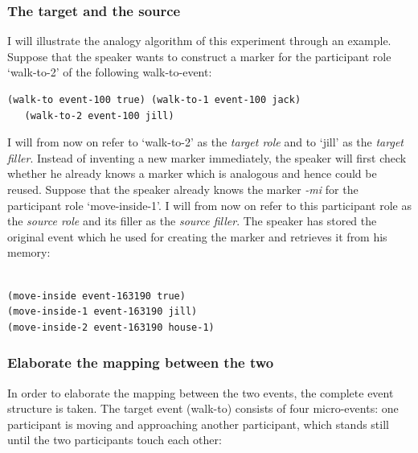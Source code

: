\subsubsection{The target and the source}
 I will illustrate the analogy algorithm of this experiment through an example. Suppose that the speaker wants to construct a marker for the participant role `walk-to-2' of the following walk-to-event:

\ea
\begin{lstlisting}
(walk-to event-100 true) (walk-to-1 event-100 jack)
   (walk-to-2 event-100 jill)
\end{lstlisting}
\z

I will from now on refer to `walk-to-2' as the {\em target role} and to `jill' as the {\em target filler}. Instead of inventing a new marker immediately, the speaker will first check whether he already knows a marker which is analogous and hence could be reused. Suppose that the speaker already knows the marker {\em -mi} for the participant role `move-inside-1'. I will from now on refer to this participant role as the {\em source role} and its filler as the {\em source filler}. The speaker has stored the original event which he used for creating the marker and retrieves it from his memory:

\ea
\begin{lstlisting}
 
(move-inside event-163190 true) 
(move-inside-1 event-163190 jill)
(move-inside-2 event-163190 house-1)
\end{lstlisting}
\z

\subsubsection{Elaborate the mapping between the two}
 In order to elaborate the mapping between the two events, the complete event structure is taken. The target event (walk-to) consists of four micro-events: one participant is moving and approaching another participant, which stands still until the two participants touch each other:

